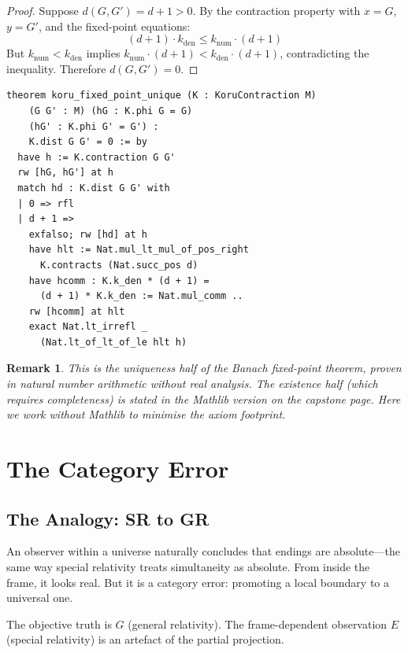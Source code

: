 \documentclass[12pt,a4paper]{article}
\newtheorem{remark}[theorem]{Remark}
\begin{document}
\begin{proof}
Suppose $d(G, G') = d + 1 > 0$. By the contraction property with
$x = G$, $y = G'$, and the fixed-point equations:
\[
  (d+1) \cdot k_{\mathrm{den}} \leq k_{\mathrm{num}} \cdot (d+1)
\]
But $k_{\mathrm{num}} < k_{\mathrm{den}}$ implies
$k_{\mathrm{num}} \cdot (d+1) < k_{\mathrm{den}} \cdot (d+1)$,
contradicting the inequality. Therefore $d(G, G') = 0$.
\end{proof}

\begin{lstlisting}[caption={Lean proof of Koru uniqueness}]
theorem koru_fixed_point_unique (K : KoruContraction M)
    (G G' : M) (hG : K.phi G = G)
    (hG' : K.phi G' = G') :
    K.dist G G' = 0 := by
  have h := K.contraction G G'
  rw [hG, hG'] at h
  match hd : K.dist G G' with
  | 0 => rfl
  | d + 1 =>
    exfalso; rw [hd] at h
    have hlt := Nat.mul_lt_mul_of_pos_right
      K.contracts (Nat.succ_pos d)
    have hcomm : K.k_den * (d + 1) =
      (d + 1) * K.k_den := Nat.mul_comm ..
    rw [hcomm] at hlt
    exact Nat.lt_irrefl _
      (Nat.lt_of_lt_of_le hlt h)
\end{lstlisting}

\begin{remark}
This is the uniqueness half of the Banach fixed-point theorem, proven
in natural number arithmetic without real analysis. The existence half
(which requires completeness) is stated in the Mathlib version on the
capstone page. Here we work without Mathlib to minimise the axiom
footprint.
\end{remark}

\section{The Category Error}

\subsection{The Analogy: SR to GR}

An observer within a universe naturally concludes that endings are
absolute---the same way special relativity treats simultaneity as
absolute. From inside the frame, it looks real. But it is a category
error: promoting a local boundary to a universal one.

The objective truth is $G$ (general relativity). The frame-dependent
observation $E$ (special relativity) is an artefact of the partial
projection.
\end{document}
